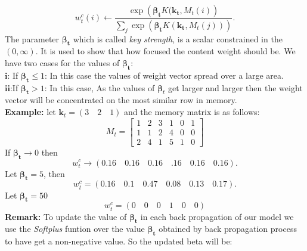\documentclass{amsart}
\numberwithin{equation}{section}
\theoremstyle{definition}
\theoremstyle{remark}
\begin{document}
$$w_t^c(i)\leftarrow \frac{\exp\left(\bm{\beta_t} K(\bm{k_t},M_t(i)\right)}{\sum_j \exp \left( \bm{\beta_t}K(\bm{k_t},M_t(j))\right)}. $$
The parameter $\bm{\beta_t}$ which is called \textit{key strength}, is a scalar constrained in the  $(0,\infty)$. It is used to show that how focused the content weight should be. We have two cases for the values of $\bm{\beta_t}$:\\
$\textbf{i:}$ If $\bm{\beta_t }\leq1$: In this case the values of weight vector spread over a large area. \\
$\textbf{ii:}$If $\bm{\beta_t} >1$: In this case, As the values of $\bm\beta_t$ get larger and larger then the weight vector will be concentrated on the most similar row in memory.\\
\textbf{Example:}
let $\bm k_t= (3\quad 2 \quad1)$ and the memory matrix is as follows:
\[M_t=
\begin{bmatrix}
    1     & 2& 3 & 1 &0&1 \\
    1      & 1 & 2 & 4 & 0&0 \\

    2  & 4& 1& 5 & 1&0
\end{bmatrix}
\]
If $\bm {\beta_t} \rightarrow 0$ then
$$w_t^c \rightarrow (0.16\quad  0.16\quad 0.16\quad .16\quad 0.16\quad 0.16).$$
Let $\bm{\beta_t}=5$, then
$$w_t^c= (0.16\quad 0.1\quad 0.47\quad 0.08 \quad0.13\quad 0.17).$$
Let $\bm{\beta_t}=50$
$$w_t^c= (0\quad 0\quad 0\quad 1\quad 0\quad 0)$$
\textbf{Remark:} To update the value of $\bm{\beta_t}$ in each back propagation of our model we use the \textit{Softplus} funtion over the value $\bm{\beta_t}$ obtained by back propagation process to have get a non-negative value. So the updated beta will be:
\end{document}
